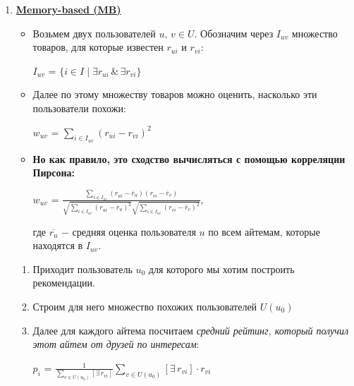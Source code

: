                  \begin{enumerate}
                     \item \underline{\textbf{Memory-based (MB)}}
                    \begin{itemize}
                        \item Возьмем двух пользователей $u, \, v \in U$. Обозначим через $I_{uv}$ множество товаров, для которые известен $r_{ui}$ и $r_{vi}$:
                        \begin{center}
                        \Large
                            $I_{uv}$ = $\{ i \in I \mid \exists r_{ui} \, \& \, \exists r_{vi} \}$
                        \end{center}

                    \item Далее по этому множеству товаров можно оценить, насколько эти пользователи похожи:
                    \begin{center}
                        \Large
                        $w_{uv}$ = $\sum\limits_{i \in I_{uv}} (r_{ui} - r_{vi})^2$
                    \end{center}

                    \item \textbf{Но как правило, это сходство вычисляться с помощью корреляции Пирсона:}
                        \begin{center}
                        \huge
                            $w_{uv}$ = $\frac{\sum\limits_{i \in I_{uv}}(r_{ui} - \overline{r}_{u})(r_{vi} - \overline{r}_{v})}{\sqrt{\sum\limits_{i \in I_{uv}} (r_{ui} - \overline{r}_{u})^2}\sqrt{\sum\limits_{i \in I_{uv}}(r_{vi} - \overline{r}_{v})^2}}$,
                        \end{center}
                        где $\overline{r_{u}}$ $-$ средняя оценка пользователя $u$ по всем айтемам, которые находятся в $I_{uv}$.\\
                    \end{itemize}
                    \begin{enumerate}
                        \item Приходит пользователь $u_0$ для которого мы хотим построить рекомендации.

                        \item  Строим для него множество похожих пользователей $U(u_0)$

                        \item Далее для каждого айтема посчитаем \textit{средний рейтинг, который получил этот айтем от друзей по интересам}:
                        \begin{center}
                        \Large 
                            $p_i$ = $\frac{1}{\sum\limits_{v \in U(u_0)}[ \exists \, r_{vi}]}\sum\limits_{v \in U(u_0)}[\exists \, r_{vi}] \cdot r_{vi}$
                        \end{center}



\end{enumerate}
\end{enumerate}
